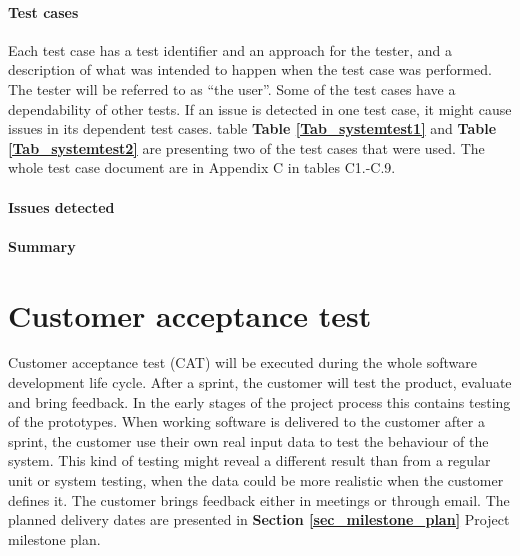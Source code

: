 {{\paragraph{Test cases}
Each test case has a test identifier and an approach for the tester, and a description of what was intended to happen when the test case was performed. The tester will be referred to as “the user”. 
Some of the test cases have a dependability of other tests. If an issue is detected in one test case, it might cause issues in its dependent test cases. table \textbf{Table \ref{Tab_systemtest1}} and \textbf{Table \ref{Tab_systemtest2}} are presenting two of the test cases that were used. The whole test case document are in Appendix C in tables C1.-C.9. 

\paragraph{Issues detected}

\paragraph{Summary}

\section{Customer acceptance test}
\label{sec_acceptance_test}

Customer acceptance test (CAT) will be executed during the whole software development life cycle. After a sprint, the customer will test the product, evaluate and bring feedback. In the early stages of the project process this contains testing of the prototypes. When working software is delivered to the customer after a sprint, the customer use their own real input data to test the behaviour of the system. This kind of testing might reveal a different result than from a regular unit or system testing, when the data could be more realistic when the customer defines it. The customer brings feedback either in meetings or through email. The planned delivery dates are presented in \textbf{Section \ref{sec_milestone_plan}} Project milestone plan.  

\renewcommand{\arraystretch}{2}%
\begin{center}
	\begin{longtable}{ | p{4cm} | p{13cm} | }
		

\end{longtable}
\end{center}}}

